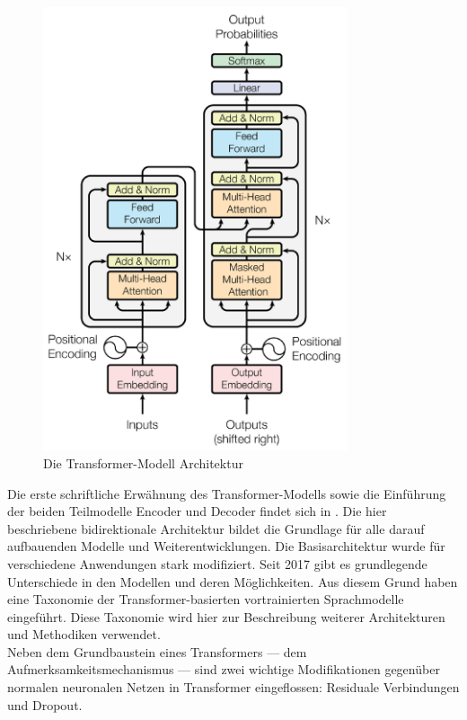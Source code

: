 \begin{figure}[ht]
    \centering
    \includegraphics[width=0.8\textwidth]{zeichnungen/transformer.png}
    \caption{Die Transformer-Modell Architektur \citep{attention}}
    \label{bild:transformer}
\end{figure}

Die erste schriftliche Erwähnung des Transformer-Modells sowie die Einführung der beiden Teilmodelle Encoder und Decoder findet sich in \citet{attention}.
Die hier beschriebene bidirektionale Architektur bildet die Grundlage für alle darauf aufbauenden Modelle und Weiterentwicklungen.
Die Basisarchitektur wurde für verschiedene Anwendungen stark modifiziert.
Seit 2017 gibt es grundlegende Unterschiede in den Modellen und deren Möglichkeiten.
Aus diesem Grund haben \citet{ammus} eine Taxonomie der Transformer-basierten vortrainierten Sprachmodelle eingeführt.
Diese Taxonomie wird hier zur Beschreibung weiterer Architekturen und Methodiken verwendet.\\

Neben dem Grundbaustein eines Transformers --- dem Aufmerksamkeitsmechanismus --- sind zwei wichtige Modifikationen gegenüber normalen neuronalen Netzen in Transformer eingeflossen: Residuale Verbindungen und Dropout.\\

